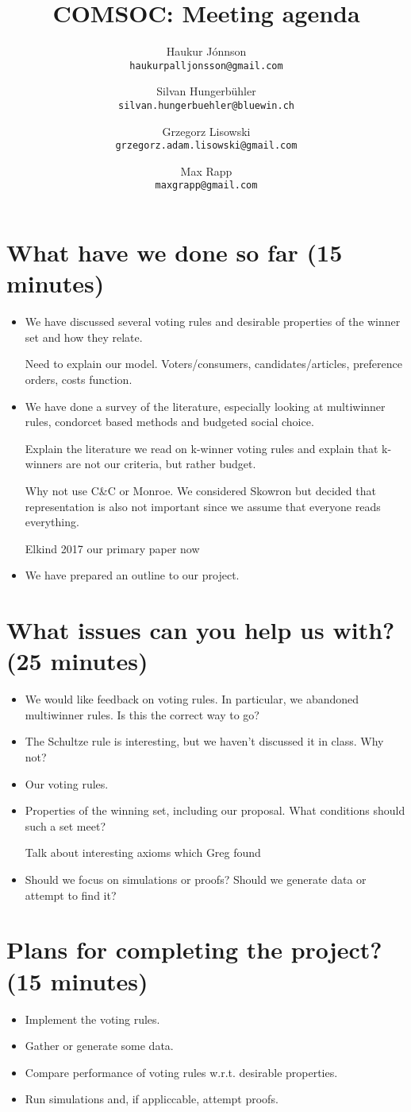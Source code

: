 \documentclass[10pt,a4paper, english]{article}
\author{
    Haukur J{\'o}nnson\\    \texttt{haukurpalljonsson@gmail.com}
    \and
    Silvan Hungerb{\"u}hler\\   \texttt{silvan.hungerbuehler@bluewin.ch}
    \and
    Grzegorz Lisowski\\  \texttt{grzegorz.adam.lisowski@gmail.com}
    \and
    Max Rapp\\  \texttt{maxgrapp@gmail.com}
}
\title{%
  COMSOC: Meeting agenda}
\date{}
\begin{document}
\maketitle

\section{What have we done so far (15 minutes)}
\begin{itemize}
\item We have discussed several voting rules and desirable properties of the winner set and how they relate.

Need to explain our model. Voters/consumers, candidates/articles, preference orders, costs function.

\item We have done a survey of the literature, especially looking at multiwinner rules, condorcet based methods and budgeted social choice.

Explain the literature we read on k-winner voting rules and explain that k-winners are not our criteria, but rather budget.

Why not use C\&C or Monroe. We considered Skowron but decided that representation is also not important since we assume that everyone reads everything.

Elkind 2017 our primary paper now

\item We have prepared an outline to our project.
\end{itemize}

\section{What issues can you help us with? (25 minutes)}
\begin{itemize}
\item We would like feedback on voting rules. In particular, we abandoned multiwinner rules. Is this the correct way to go?
\item The Schultze rule is interesting, but we haven't discussed it in class. Why not?
\item Our voting rules.
\item Properties of the winning set, including our proposal. What conditions should such a set meet?

Talk about interesting axioms which Greg found

\item Should we focus on simulations or proofs? Should we generate data or attempt to find it?

\end{itemize}

\section{Plans for completing the project? (15 minutes)}
\begin{itemize}
\item Implement the voting rules.
\item Gather or generate some data.
\item Compare performance of voting rules w.r.t. desirable properties.
\item Run simulations and, if appliccable, attempt proofs.
\end{itemize}
\end{document}

